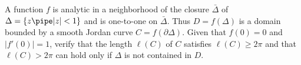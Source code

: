 A function $f$ is analytic in a neighborhood of the closure
$\bar{\Delta}$ of $\Delta=\{z\pipe |z|<1\}$ and is one-to-one on
$\bar{\Delta}$. Thus $D=f(\Delta)$ is a domain bounded by a smooth
Jordan curve $C=f(\partial\Delta)$. Given that $f(0)=0$ and
$|f'(0)|=1$, verify that the length $\ell(C)$ of $C$ satisfies
$\ell(C)\geq 2\pi$ and that $\ell(C)>2\pi$ can hold only if $\Delta$
is not contained in $D$.
